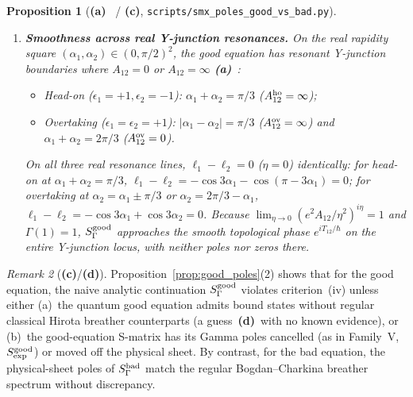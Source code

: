 \documentclass[11pt,a4paper]{article}
\newcommand{\La}{\textsf{\textbf{(a)}}}
\newcommand{\Lc}{\textsf{\textbf{(c)}}}
\newcommand{\Ld}{\textsf{\textbf{(d)}}}
\newcommand{\script}[1]{\texttt{scripts/\allowbreak #1}}
\newtheorem{proposition}{Proposition}[section]
\theoremstyle{remark}
\newtheorem{remark}[proposition]{Remark}
\begin{document}
\begin{proposition}[\La~\cite{LMK,BD} / \Lc, \script{smx\_poles\_good\_vs\_bad.py}]
\begin{enumerate}
\begin{equation}
\end{equation}
Hence $\Gamma(1+i\eta)$ in $S_{\Gamma,\rm ov}^{\rm good}$ has simple poles on the physical sheet $\operatorname{Im}(P_1-P_2)>0$ at
\begin{equation}\label{eq:spurious_poles}
\sinh 3b=-\frac{9N\hbar}{4\sin 3a}\qquad(N=1,2,\dots),
\end{equation}
even though at every such root $A_{12}^{\rm good}(a-ib,a+ib)<1/4$ corresponds to a \emph{singular} solution (for instance, at $\hbar=0.05$ and $N=1$, $a=0.4$ gives $b=-0.04021$, $\operatorname{Im}(P_1-P_2)=0.01919>0$, and $A_{12}^{\rm good}=-2.177<0$; $a=0.65$ gives $b=-0.04031$, $\operatorname{Im}(P_1-P_2)=0.05586>0$, and $A_{12}^{\rm good}=+0.02585<1/4$).
\item \textbf{Smoothness across real Y-junction resonances.}
On the real rapidity square $(\alpha_1,\alpha_2)\in(0,\pi/2)^2$, the good equation has resonant Y-junction boundaries where $A_{12}=0$ or $A_{12}=\infty$ \La~\cite{LMK,BD,RS}:
\begin{itemize}
\item Head-on ($\epsilon_1=+1,\epsilon_2=-1$): $\alpha_1+\alpha_2=\pi/3$ ($A_{12}^{\rm ho}=\infty$);
\item Overtaking ($\epsilon_1=\epsilon_2=+1$): $|\alpha_1-\alpha_2|=\pi/3$ ($A_{12}^{\rm ov}=\infty$) and $\alpha_1+\alpha_2=2\pi/3$ ($A_{12}^{\rm ov}=0$).
\end{itemize}
On \emph{all three} real resonance lines, $\ell_1-\ell_2=0$ ($\eta=0$) identically: for head-on at $\alpha_1+\alpha_2=\pi/3$, $\ell_1-\ell_2=-\cos 3\alpha_1-\cos(\pi-3\alpha_1)=0$; for overtaking at $\alpha_2=\alpha_1\pm\pi/3$ or $\alpha_2=2\pi/3-\alpha_1$, $\ell_1-\ell_2=-\cos 3\alpha_1+\cos 3\alpha_2=0$. Because $\lim_{\eta\to 0}(e^2 A_{12}/\eta^2)^{i\eta}=1$ and $\Gamma(1)=1$, $S_\Gamma^{\rm good}$ approaches the smooth topological phase $e^{iT_{12}/\hbar}$ on the entire Y-junction locus, with neither poles nor zeros there.
\end{enumerate}
\end{proposition}

\begin{remark}[\Lc/\Ld]
Proposition~\ref{prop:good_poles}(2) shows that for the good equation, the naive analytic continuation $S_\Gamma^{\rm good}$ violates criterion~(iv) unless either (a)~the quantum good equation admits bound states without regular classical Hirota breather counterparts (a guess~\Ld\ with no known evidence), or (b)~the good-equation S-matrix has its Gamma poles cancelled (as in Family~V, $S_{\rm exp}^{\rm good}$) or moved off the physical sheet. By contrast, for the bad equation, the physical-sheet poles of $S_\Gamma^{\rm bad}$ match the regular Bogdan--Charkina breather spectrum without discrepancy.
\end{remark}
\end{document}
